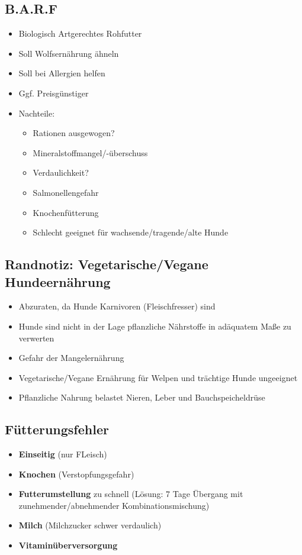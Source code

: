     \subsection{B.A.R.F}
        \begin{itemize}
            \item Biologisch Artgerechtes Rohfutter
            \item Soll Wolfsernährung ähneln
            \item Soll bei Allergien helfen
            \item Ggf. Preisgünstiger
            \item Nachteile:
            \begin{itemize}
                \item Rationen ausgewogen?
                \item Mineralstoffmangel/-überschuss
                \item Verdaulichkeit?
                \item Salmonellengefahr
                \item Knochenfütterung
                \item Schlecht geeignet für wachsende/tragende/alte Hunde
            \end{itemize}
        \end{itemize}

    \subsection{Randnotiz: Vegetarische/Vegane Hundeernährung}
        \begin{itemize}
            \item Abzuraten, da Hunde Karnivoren (Fleischfresser) sind
            \item Hunde sind nicht in der Lage pflanzliche Nährstoffe in adäquatem Maße zu verwerten
            \item Gefahr der Mangelernährung
            \item Vegetarische/Vegane Ernährung für Welpen und trächtige Hunde ungeeignet
            \item Pflanzliche Nahrung belastet Nieren, Leber und Bauchspeicheldrüse
        \end{itemize}

    \subsection{Fütterungsfehler}
        \begin{itemize}
            \item \textbf{Einseitig} (nur FLeisch)
            \item \textbf{Knochen} (Verstopfungsgefahr)
            \item \textbf{Futterumstellung} zu schnell (Lösung: 7 Tage Übergang mit zunehmender/abnehmender Kombinationsmischung)
            \item\textbf{Milch} (Milchzucker schwer verdaulich)
            \item \textbf{Vitaminüberversorgung}
        \end{itemize}


